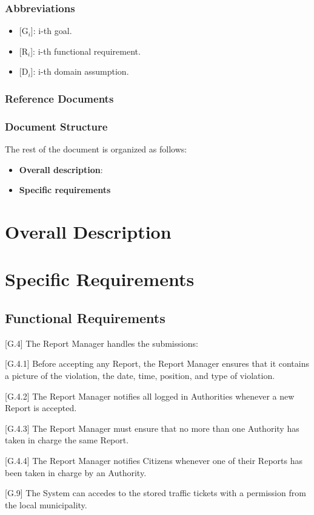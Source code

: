 \documentclass{report}
\begin{document}
 \subsection{Abbreviations}
 \begin{itemize}
 \item {[G$_{i}$]}: i-th goal.
 \item {[R$_{i}$]}: i-th functional requirement.
 \item {[D$_{i}$]}: i-th domain assumption.
 \end{itemize}
 \subsection{Reference Documents}
 \subsection{Document Structure}
 The rest of the document is organized as follows:
 \begin{itemize}
 \item{\textbf{Overall description}}: 
 \item{\textbf{Specific requirements}}
 \end{itemize}

\chapter{Overall Description}
\chapter{Specific Requirements}
\section{Functional Requirements}
\begin{itemize}
\item {[G.4]} The Report Manager handles the submissions:
    {\setlength\itemindent{25pt} \item {[G.4.1]} Before accepting any Report, the Report Manager ensures that it contains a picture of the violation, the date, time, position, and type of violation.}
    {\setlength\itemindent{25pt} \item {[G.4.2]} The Report Manager notifies all logged in Authorities whenever a new Report is accepted.}
    {\setlength\itemindent{25pt} \item {[G.4.3]} The Report Manager must ensure that no more than one Authority has taken in charge the same Report.}
    {\setlength\itemindent{25pt} \item {[G.4.4]} The Report Manager notifies Citizens whenever one of their Reports has been taken in charge by an Authority.}
\item {[G.9]} The System can accedes to the stored traffic tickets with a permission from the local municipality.
\end{itemize}
\end{document}
